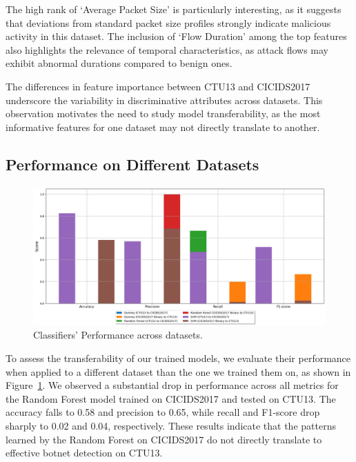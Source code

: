 The high rank of `Average Packet Size' is particularly interesting, as it suggests that deviations from standard packet size profiles strongly indicate malicious activity in this dataset. The inclusion of `Flow Duration' among the top features also highlights the relevance of temporal characteristics, as attack flows may exhibit abnormal durations compared to benign ones.

The differences in feature importance between CTU13 and CICIDS2017 underscore the variability in discriminative attributes across datasets. This observation motivates the need to study model transferability, as the most informative features for one dataset may not directly translate to another.

\subsection{Performance on Different Datasets}\label{subsec:performance-different-dataset}

\begin{figure}[H]
    \centering
    \includegraphics[width=1\textwidth]{img/Classifier_Performance _Across_Datasets.png}
    \caption{Classifiers' Performance across datasets.}\label{fig:classifier_performance_across_dataset}
\end{figure}

To assess the transferability of our trained models, we evaluate their performance when applied to a different dataset than the one we trained them on, as shown in Figure~\ref{fig:classifier_performance_across_dataset}. We observed a substantial drop in performance across all metrics for the Random Forest model trained on CICIDS2017 and tested on CTU13. The accuracy falls to 0.58 and precision to 0.65, while recall and F1-score drop sharply to 0.02 and 0.04, respectively. These results indicate that the patterns learned by the Random Forest on CICIDS2017 do not directly translate to effective botnet detection on CTU13.

